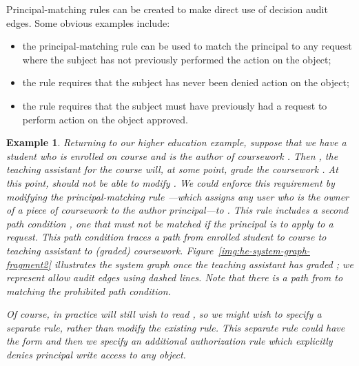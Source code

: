 \documentclass{article}
\newtheorem{example}{Example}
\begin{document}
Principal-matching rules can be created to make direct use of decision audit edges.
Some obvious examples include:
 \begin{itemize}
  \item the principal-matching rule  can be used to match the principal  to any request where the subject has not previously performed the action  on the object;
  \item the rule  requires that the subject has never been denied action  on the object;
  \item the rule  requires that the subject must have previously had a request to perform action  on the object approved.
 \end{itemize}

\begin{example}\label{ex:higher-education-2}
Returning to our higher education example, suppose that we have a student  who is enrolled on course  and is the author of coursework .
Then , the teaching assistant for the course will, at some point, grade the coursework .
At this point,  should not be able to modify .
We could enforce this requirement by modifying the principal-matching rule ---which assigns any user who is the owner of a piece of coursework to the author principal---to .
This rule includes a second path condition , one that must not be matched if the principal  is to apply to a request.
This path condition traces a path from enrolled student to course to teaching assistant to (graded) coursework.
Figure~\ref{img:he-system-graph-fragment2} illustrates the system graph once the teaching assistant has graded ; we represent allow audit edges using dashed lines.
Note that there is a path from  to  matching the prohibited path condition.

Of course, in practice  will still wish to read , so we might wish to specify a separate rule, rather than modify the existing rule.
This separate rule could have the form  and then we specify an additional authorization rule  which explicitly denies principal  write access to any object.


\end{example}
\end{document}
